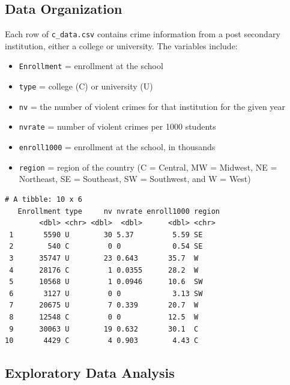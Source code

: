 \documentclass[
]{krantz}
\providecommand{\tightlist}{%
  \setlength{\itemsep}{0pt}\setlength{\parskip}{0pt}}
\begin{document}
\hypertarget{data-organization-1}{%
\subsection{Data Organization}\label{data-organization-1}}

Each row of \texttt{c\_data.csv} contains crime information from a post secondary institution, either a college or university. The variables include:

\begin{itemize}
\tightlist
\item
  \texttt{Enrollment} = enrollment at the school
\item
  \texttt{type} = college (C) or university (U)
\item
  \texttt{nv} = the number of violent crimes for that institution for the given year
\item
  \texttt{nvrate} = number of violent crimes per 1000 students
\item
  \texttt{enroll1000} = enrollment at the school, in thousands
\item
  \texttt{region} = region of the country (C = Central, MW = Midwest, NE = Northeast, SE = Southeast, SW = Southwest, and W = West)
\end{itemize}

\begin{verbatim}
# A tibble: 10 x 6
   Enrollment type     nv nvrate enroll1000 region
        <dbl> <chr> <dbl>  <dbl>      <dbl> <chr> 
 1       5590 U        30 5.37         5.59 SE    
 2        540 C         0 0            0.54 SE    
 3      35747 U        23 0.643       35.7  W     
 4      28176 C         1 0.0355      28.2  W     
 5      10568 U         1 0.0946      10.6  SW    
 6       3127 U         0 0            3.13 SW    
 7      20675 U         7 0.339       20.7  W     
 8      12548 C         0 0           12.5  W     
 9      30063 U        19 0.632       30.1  C     
10       4429 C         4 0.903        4.43 C     
\end{verbatim}

\hypertarget{exploratory-data-analysis}{%
\subsection{Exploratory Data Analysis}\label{exploratory-data-analysis}}
\end{document}
